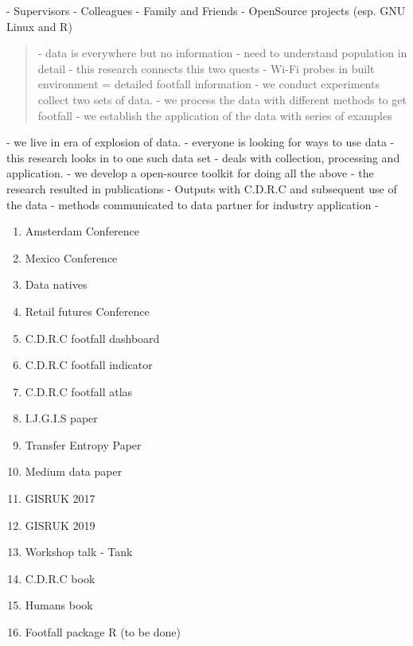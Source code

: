 \begin{acknowledgements}
- Supervisors
- Colleagues
- Family and Friends
- OpenSource projects (esp. GNU Linux and R)
\end{acknowledgements}

\begin{abstract}
 - data is everywhere but no information
 - need to understand population in detail
 - this research connects this two quests
 - Wi-Fi probes in built environment = detailed footfall information
 - we conduct experiments collect two sets of data.
 - we process the data with different methods to get footfall
 - we establish the application of the data with series of examples
\end{abstract}

\begin{impact_statement}
 - we live in era of explosion of data.
 - everyone is looking for ways to use data
 - this research looks in to one such data set
 - deals with collection, processing and application.
 - we develop a open-source toolkit for doing all the above
 - the research resulted in publications
 - Outputs with C.D.R.C and subsequent use of the data 
 - methods communicated to data partner for industry application 
 - \citep{gandomi2015beyond}
\end{impact_statement}

\begin{list_of_outputs}
    \begin{enumerate}
        \item Amsterdam Conference
        \item Mexico Conference
        \item Data natives
        \item Retail futures Conference 
        \item C.D.R.C footfall dashboard
        \item C.D.R.C footfall indicator
        \item C.D.R.C footfall atlas
        \item I.J.G.I.S paper
        \item Transfer Entropy Paper
        \item Medium data paper
        \item GISRUK 2017
        \item GISRUK 2019
        \item Workshop talk - Tank
        \item C.D.R.C book
        \item Humans book
        \item Footfall package R (to be done)
    \end{enumerate}
\end{list_of_outputs}

\setcounter{secnumdepth}{1}
\setcounter{tocdepth}{1}
\tableofcontents
\listoffigures
\listoftables
